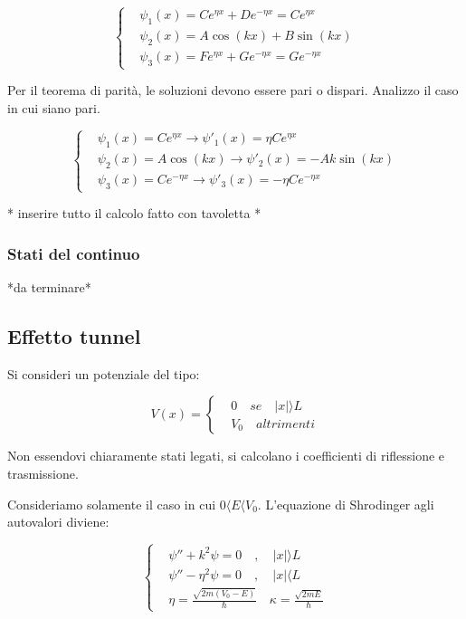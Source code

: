 \documentclass{report}
\begin{document}
\begin{equation}
  \left\{
  \begin{aligned}
     & \psi_1(x)= Ce^{\eta x}+De^{-\eta x}= Ce^{\eta x}  \\
     & \psi_2(x)= A\cos(kx)+B\sin(kx)                    \\
     & \psi_3(x)= Fe^{\eta x}+Ge^{-\eta x}= Ge^{-\eta x}
  \end{aligned}
  \right.
\end{equation}

Per il teorema di parità, le soluzioni devono essere pari o dispari. Analizzo il caso in cui siano pari.

\begin{equation}
  \left\{
  \begin{aligned}
     & \psi_1(x)= Ce^{\eta x} \rightarrow \psi'_1(x)= \eta Ce^{\eta x}    \\
     & \psi_2(x)= A\cos(kx) \rightarrow \psi'_2(x)= -Ak\sin(kx)           \\
     & \psi_3(x)= Ce^{-\eta x} \rightarrow \psi'_3(x)= -\eta Ce^{-\eta x}
  \end{aligned}
  \right.
\end{equation}

* inserire tutto il calcolo fatto con tavoletta *

\subsubsection{Stati del continuo}
*da terminare*

\subsection{Effetto tunnel}
Si consideri un potenziale del tipo:

\begin{equation}
  V(x)=
  \left\{
  \begin{aligned}
     & 0 \quad se \quad |x|\rangle L \\
     & V_0 \quad altrimenti
  \end{aligned}
  \right.
\end{equation}

Non essendovi chiaramente stati legati, si calcolano i coefficienti di riflessione e trasmissione.

Consideriamo solamente il caso in cui $0\langle E\langle V_0$.
L'equazione di Shrodinger agli autovalori diviene:

\begin{equation}
  \left\{
  \begin{aligned}
     & \psi''+k^2\psi=0  \quad , \quad |x|\rangle L                                \\
     & \psi''-\eta^2\psi=0  \quad , \quad |x|\langle L                             \\
     & \eta= \frac{\sqrt{2m(V_0-E)}}{\hbar} \quad \kappa= \frac{\sqrt{2mE}}{\hbar}
  \end{aligned}
  \right.
\end{equation}
\end{document}
